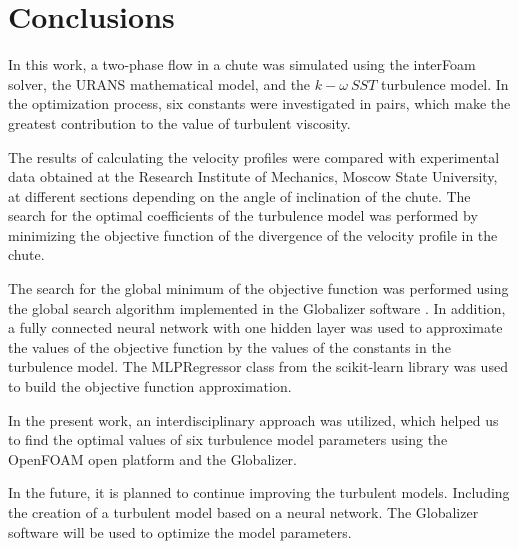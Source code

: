 \documentclass[mathematics,article,submit,pdftex,moreauthors]{Definitions/mdpi}
\begin{document}
\section{Conclusions}

In this work, a two-phase flow in a chute was simulated using the interFoam solver, the URANS mathematical model, and the $k-\omega\ SST$ turbulence model. In the optimization process, six constants were investigated in pairs, which make the greatest contribution to the value of turbulent viscosity.

The results of calculating the velocity profiles were compared with experimental data obtained at the Research Institute of Mechanics, Moscow State University, at different sections depending on the angle of inclination of the chute. The search for the optimal coefficients of the turbulence model was performed by minimizing the objective function of the divergence of the velocity profile in the chute. %

The search for the global minimum of the objective function was performed using the global search algorithm implemented in the Globalizer software \cite{globalizerSystem}. In addition, a fully connected neural network with one hidden layer was used to approximate the values of the objective function by the values of the constants in the turbulence model. The MLPRegressor class from the scikit-learn library was used to build the objective function approximation.


In the present work, an interdisciplinary approach was utilized, which helped us to find the optimal values of six turbulence model parameters using the OpenFOAM open platform and the Globalizer.  

In the future, it is planned to continue improving the turbulent models. Including the creation of a turbulent model based on a neural network. The Globalizer software will be used to optimize the model parameters.

\vspace{6pt} 


\end{document}
